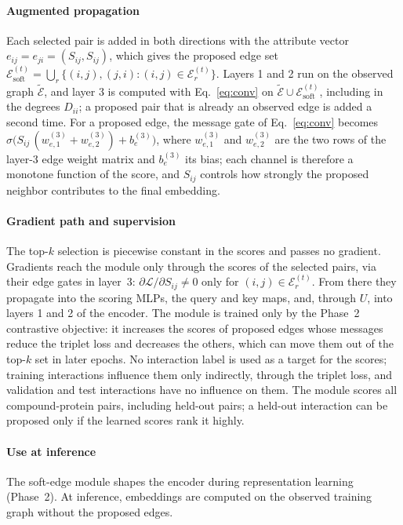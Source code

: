 \documentclass[11pt,letterpaper]{article}
\begin{document}
\paragraph{Augmented propagation}
Each selected pair is added in both directions with the attribute vector $e_{ij}=e_{ji}=(S_{ij},S_{ij})$, which gives the proposed edge set $\mathcal{E}^{(t)}_{\text{soft}}=\bigcup_r\{(i,j),(j,i):(i,j)\in\mathcal{E}^{(t)}_r\}$. Layers 1 and 2 run on the observed graph $\tilde{\mathcal{E}}$, and layer 3 is computed with Eq.~\eqref{eq:conv} on $\tilde{\mathcal{E}}\cup\mathcal{E}^{(t)}_{\text{soft}}$, including in the degrees $D_{ii}$; a proposed pair that is already an observed edge is added a second time. For a proposed edge, the message gate of Eq.~\eqref{eq:conv} becomes $\sigma\big(S_{ij}\,(w^{(3)}_{e,1}+w^{(3)}_{e,2})+b^{(3)}_e\big)$, where $w^{(3)}_{e,1}$ and $w^{(3)}_{e,2}$ are the two rows of the layer-3 edge weight matrix and $b^{(3)}_e$ its bias; each channel is therefore a monotone function of the score, and $S_{ij}$ controls how strongly the proposed neighbor contributes to the final embedding.

\paragraph{Gradient path and supervision}
The top-$k$ selection is piecewise constant in the scores and passes no gradient. Gradients reach the module only through the scores of the selected pairs, via their edge gates in layer~3: $\partial\mathcal{L}/\partial S_{ij}\neq 0$ only for $(i,j)\in\mathcal{E}^{(t)}_r$. From there they propagate into the scoring MLPs, the query and key maps, and, through $U$, into layers 1 and 2 of the encoder. The module is trained only by the Phase~2 contrastive objective: it increases the scores of proposed edges whose messages reduce the triplet loss and decreases the others, which can move them out of the top-$k$ set in later epochs. No interaction label is used as a target for the scores; training interactions influence them only indirectly, through the triplet loss, and validation and test interactions have no influence on them. The module scores all compound-protein pairs, including held-out pairs; a held-out interaction can be proposed only if the learned scores rank it highly.

\paragraph{Use at inference}
The soft-edge module shapes the encoder during representation learning (Phase~2). At inference, embeddings are computed on the observed training graph without the proposed edges.
\end{document}
